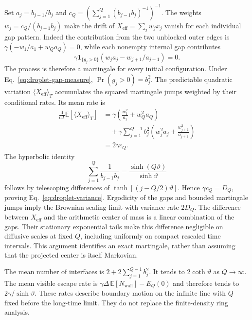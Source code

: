 \documentclass[aps,pre,reprint,amsmath,amssymb,longbibliography,floatfix]{revtex4-2}
\newcommand{\E}{\mathbb E}
\begin{document}
Set $a_j=b_{j-1}/b_j$ and
$c_Q=(\sum_{j=1}^{Q}(b_{j-1}b_j)^{-1})^{-1}$. The weights
$w_j=c_Q/(b_{j-1}b_j)$ make the drift of
$X_{\mathrm{eff}}=\sum_jw_jx_j$ vanish for each individual gap pattern.
Indeed the contribution from the two unblocked outer edges is
$\gamma(-w_1/a_1+w_Qa_Q)=0$, while each nonempty internal gap contributes
\begin{equation}
 \gamma\mathbf1_{\{g_j>0\}}
       (w_ja_j-w_{j+1}/a_{j+1})=0 .
 \label{eq:droplet-drift-cancellation}
\end{equation}
The process is therefore a martingale for every initial configuration.
Under Eq.~\eqref{eq:droplet-gap-measure},
$\Pr(g_j>0)=b_j^2$. The predictable quadratic variation $\langle X_{\mathrm{eff}}\rangle_T$
accumulates the squared martingale jumps weighted by their conditional
rates. Its mean rate is
\begin{align}
 \frac{\mathrm d}{\mathrm dT}\E\left[\langle X_{\mathrm{eff}}\rangle_T\right]
 &=\gamma\left(\frac{w_1^2}{a_1}+w_Q^2a_Q\right)\nonumber\\
 &\quad+\gamma\sum_{j=1}^{Q-1}b_j^2
 \left(w_j^2a_j+\frac{w_{j+1}^2}{a_{j+1}}\right)
 \nonumber\\
 &=2\gamma c_Q .
 \label{eq:droplet-bracket}
\end{align}
The hyperbolic identity
\begin{equation}
 \sum_{j=1}^{Q}\frac1{b_{j-1}b_j}
 =\frac{\sinh(Q\vartheta)}{\sinh\vartheta}
 \label{eq:droplet-telescope}
\end{equation}
follows by telescoping differences of $\tanh\left[(j-Q/2)\vartheta\right]$.
Hence $\gamma c_Q=D_Q$, proving
Eq.~\eqref{eq:droplet-variance}. Ergodicity of the gaps and bounded
martingale jumps imply the Brownian scaling limit with variance rate
$2D_Q$. The difference between $X_{\mathrm{eff}}$ and the arithmetic center
of mass is a linear combination of the gaps. Their stationary
exponential tails make this difference negligible on diffusive scales
at fixed $Q$, including uniformly on compact rescaled time intervals.
This argument identifies an exact martingale, rather than assuming that
the projected center is itself Markovian.

The mean number of interfaces is $2+2\sum_{j=1}^{Q-1}b_j^2$. It tends to
$2\coth\vartheta$ as $Q\to\infty$. The mean visible escape rate is
$\gamma\Delta\,\E\left[N_{\mathrm{wall}}\right]-E_Q(0)$ and therefore tends
to $2\gamma/\sinh\vartheta$. These rates describe boundary motion on the
infinite line with $Q$ fixed before the long-time limit. They do not
replace the finite-density ring analysis.
\end{document}
